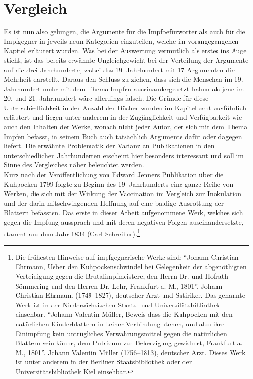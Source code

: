 \documentclass[
    a4paper,
    12pt,
    hyphens,
    chapterprefix=true,
    headheight=33pt,
    footheight=29pt,
    headings=optiontohead, %
]{scrartcl}
\begin{document}
{\section{Vergleich}
Es ist nun also gelungen, die Argumente für die Impfbefürworter als auch für die Impfgegner in jeweils neun Kategorien einzuteilen, welche im vorangegangenen Kapitel erläutert wurden. Was bei der Auswertung vermutlich als erstes ins Auge sticht, ist das bereits erwähnte Ungleichgewicht bei der Verteilung der Argumente auf die drei Jahrhunderte, wobei das 19. Jahrhundert mit 17 Argumenten die Mehrheit darstellt. Daraus den Schluss zu ziehen, dass sich die Menschen im 19. Jahrhundert mehr mit dem Thema Impfen auseinandergesetzt haben als jene im 20. und 21. Jahrhundert wäre allerdings falsch. Die Gründe für diese Unterschiedlichkeit in der Anzahl der Bücher wurden im Kapitel acht ausführlich erläutert und liegen unter anderem in der Zugänglichkeit und Verfügbarkeit wie auch den Inhalten der Werke, wonach nicht jeder Autor, der sich mit dem Thema Impfen befasst, in seinem Buch auch tatsächlich Argumente dafür oder dagegen liefert. Die erwähnte Problematik der Varianz an Publikationen in den unterschiedlichen Jahrhunderten erscheint hier besonders interessant und soll im Sinne des Vergleiches näher beleuchtet werden. \\
Kurz nach der Veröffentlichung von Edward Jenners Publikation über die Kuhpocken 1799 folgte zu Beginn des 19. Jahrhunderts eine ganze Reihe von Werken, die sich mit der Wirkung der Vaccination im Vergleich zur Inokulation und der darin mitschwingenden Hoffnung auf eine baldige Ausrottung der Blattern befassten. Das erste in dieser Arbeit aufgenommene Werk, welches sich gegen die Impfung aussprach und mit deren negativen Folgen auseinandersetzte, stammt aus dem Jahr 1834 (Carl Schreiber).\footnote{Die frühesten Hinweise auf impfgegnerische Werke sind: "`Johann Christian Ehrmann, Ueber den Kuhpockenschwindel bei Gelegenheit der abgenöthigten Verteidigung gegen die Brutalimpfmeistere, den Herrn Dr. und Hofrath Sömmering und den Herren Dr. Lehr, Frankfurt a. M., 1801"'. Johann Christian Ehrmann (1749--1827), deutscher Arzt und Satiriker. Das genannte Werk ist in der Niedersächsischen Staats- und Universitätsbibliothek einsehbar. "`Johann Valentin Müller, Beweis dass die Kuhpocken mit den natürlichen Kinderblattern in keiner Verbindung stehen, und also ihre Einimpfung kein untrügliches Verwahrungsmittel gegen die natürlichen Blattern sein könne, dem Publicum zur Beherzigung gewidmet, Frankfurt a. M., 1801"'. Johann Valentin Müller (1756--1813), deutscher Arzt. Dieses Werk ist unter anderem in der Berliner Staatsbibliothek oder der Universitätsbibliothek Kiel einsehbar.}
}
\end{document}
